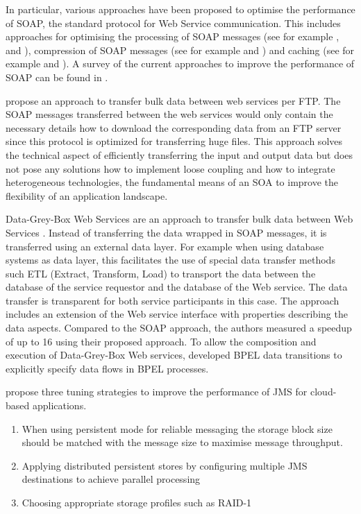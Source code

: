In particular, various approaches have been proposed to optimise the performance of SOAP, the standard protocol for Web Service communication. This includes approaches for optimising the processing of SOAP messages (see for example \citet{Abu-Ghazaleh:2005bs}, \citet{Suzumura:2005fv} and \citet{Ng:2006kl}), compression of SOAP messages (see for example \citet{Estrella:2008dz} and \citet{Ng:2005qa}) and caching (see for example \citet{andresen2004lye} and \citet{Devaram:2003fu}). A survey of the current approaches to improve the performance of SOAP can be found in \cite{Tekli:2012bh}.

\citet{Wichaiwong:2007oq} propose an approach to transfer bulk data between web services per FTP. The SOAP messages transferred between the web services would only contain the necessary details how to download the corresponding data from an FTP server since this protocol is optimized for transferring huge files. This approach solves the technical aspect of efficiently transferring the input and output data but does not pose any solutions how to implement loose coupling and how to integrate heterogeneous technologies, the fundamental means of an SOA to improve the flexibility of an application landscape.

Data-Grey-Box Web Services are an approach to transfer bulk data between Web Services \citep{Habich:2007ij}. Instead of transferring the data wrapped in SOAP messages, it is transferred using an external data layer. For example when using database systems as data layer, this facilitates the use of special data transfer methods such ETL (Extract, Transform, Load) to transport the data between the database of the service requestor and the database of the Web service. The data transfer is transparent for both service participants in this case. The approach includes an extension of the Web service interface with properties describing the data aspects. Compared to the SOAP approach, the authors measured a speedup of up to 16 using their proposed approach. To allow the composition and execution of Data-Grey-Box Web services,  \citet{Habich:kl} developed BPEL data transitions to explicitly specify data flows in BPEL processes.

\cite{Zhuang:2012qf} propose three tuning strategies to improve the performance of \ac{JMS} for cloud-based applications.
\begin{enumerate}
	\item When using persistent mode for reliable messaging the storage block size should be matched with the message size to maximise message throughput.
	\item Applying distributed persistent stores by configuring multiple JMS destinations to achieve parallel processing
	\item Choosing appropriate storage profiles such as RAID-1
\end{enumerate}

